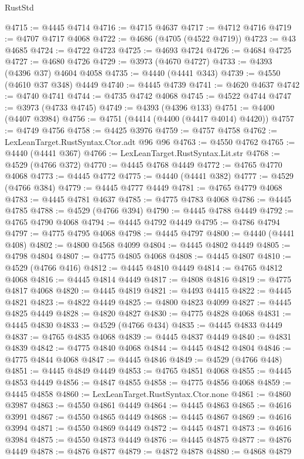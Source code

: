 \begin{lexlean}{RustStd}
\begin{coremodule}
@4715 := @4445 @4714
@4716 := @4715 @4637
@4717 := @4712 @4716
@4719 := @4707 @4717 @4068
@4722 := @4686 (@4705 (@4522 @4719))
@4723 := @43 @4685
@4724 := @4722 @4723
@4725 := @4693 @4724
@4726 := @4684 @4725
@4727 := @4680 @4726
@4729 := @3973 (@4670 @4727)
@4733 := @4393 (@4396 @37) @4604 @4058
@4735 := @4440 (@4441 @343)
@4739 := @4550 (@4610 @37 @348) @4449
@4740 := @4445 @4739
@4741 := @4620 @4637
@4742 := @4740 @4741
@4744 := @4735 @4742 @4068
@4745 := @4522 @4744
@4747 := @3973 (@4733 @4745)
@4749 := @4393 (@4396 @133)
@4751 := @4400 (@4407 @3984)
@4756 := @4751 (@4414 (@4400 (@4417 @4014) @4420))
@4757 := @4749 @4756
@4758 := @4425 @3976
@4759 := @4757 @4758
@4762 := LexLeanTarget.RustSyntax.Ctor.adt @96 @96
@4763 := @4550 @4762
@4765 := @4440 (@4441 @367)
@4766 := LexLeanTarget.RustSyntax.Lit.str
@4768 := @4529 (@4766 @372)
@4770 := @4445 @4768 @4449
@4772 := @4765 @4770 @4068
@4773 := @4445 @4772
@4775 := @4440 (@4441 @382)
@4777 := @4529 (@4766 @384)
@4779 := @4445 @4777 @4449
@4781 := @4765 @4779 @4068
@4783 := @4445 @4781 @4637
@4785 := @4775 @4783 @4068
@4786 := @4445 @4785
@4788 := @4529 (@4766 @394)
@4790 := @4445 @4788 @4449
@4792 := @4765 @4790 @4068
@4794 := @4445 @4792 @4449
@4795 := @4786 @4794
@4797 := @4775 @4795 @4068
@4798 := @4445 @4797
@4800 := @4440 (@4441 @408)
@4802 := @4800 @4568 @4099
@4804 := @4445 @4802 @4449
@4805 := @4798 @4804
@4807 := @4775 @4805 @4068
@4808 := @4445 @4807
@4810 := @4529 (@4766 @416)
@4812 := @4445 @4810 @4449
@4814 := @4765 @4812 @4068
@4816 := @4445 @4814 @4449
@4817 := @4808 @4816
@4819 := @4775 @4817 @4068
@4820 := @4445 @4819
@4821 := @4493 @4415
@4822 := @4445 @4821
@4823 := @4822 @4449
@4825 := @4800 @4823 @4099
@4827 := @4445 @4825 @4449
@4828 := @4820 @4827
@4830 := @4775 @4828 @4068
@4831 := @4445 @4830
@4833 := @4529 (@4766 @434)
@4835 := @4445 @4833 @4449
@4837 := @4765 @4835 @4068
@4839 := @4445 @4837 @4449
@4840 := @4831 @4839
@4842 := @4775 @4840 @4068
@4844 := @4445 @4842 @4804
@4846 := @4775 @4844 @4068
@4847 := @4445 @4846
@4849 := @4529 (@4766 @448)
@4851 := @4445 @4849 @4449
@4853 := @4765 @4851 @4068
@4855 := @4445 @4853 @4449
@4856 := @4847 @4855
@4858 := @4775 @4856 @4068
@4859 := @4445 @4858
@4860 := LexLeanTarget.RustSyntax.Ctor.none
@4861 := @4860 @3987
@4863 := @4550 @4861 @4449
@4864 := @4445 @4863
@4865 := @4616 @3991
@4867 := @4550 @4865 @4449
@4868 := @4445 @4867
@4869 := @4616 @3994
@4871 := @4550 @4869 @4449
@4872 := @4445 @4871
@4873 := @4616 @3984
@4875 := @4550 @4873 @4449
@4876 := @4445 @4875
@4877 := @4876 @4449
@4878 := @4876 @4877
@4879 := @4872 @4878
@4880 := @4868 @4879

\end{coremodule}
\end{lexlean}
